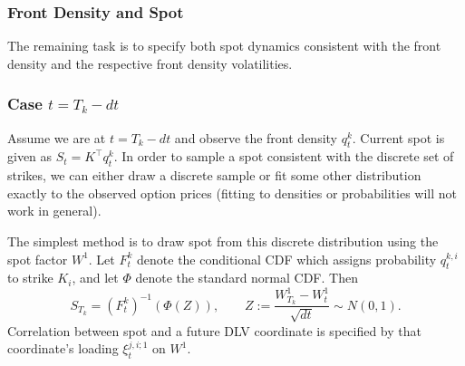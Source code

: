 \documentclass[11pt]{article}
\theoremstyle{plain}
\theoremstyle{definition}
\theoremstyle{remark}
\begin{document}
{  \subsubsection{Front Density and Spot}
  \label{sec:front-density}

  The remaining task is to specify both spot dynamics consistent with the front density and the respective front density volatilities.

  \subsubsection*{Case $t=T_k-dt$}

  Assume we are at $t=T_k-dt$ and observe the front density $q_{t}^k$. Current spot is given as $S_t = K^\top q_t^k$.
  In order to sample a spot consistent with the discrete set of strikes, we can either draw a discrete sample or fit some other distribution exactly to the observed option prices (fitting to densities or probabilities will not work in general).

  The simplest method is to draw spot from this discrete distribution using
  the spot factor $W^1$. Let $F_t^k$ denote the conditional CDF which assigns
  probability $q_t^{k,i}$ to strike $K_i$, and let $\Phi$ denote the standard
  normal CDF. Then
  \[
    S_{T_k}=(F_t^k)^{-1}\!\left(\Phi(Z)\right),
    \qquad
    Z:=\frac{W_{T_k}^1-W_t^1}{\sqrt{dt}}\sim N(0,1).
  \]
  Correlation between spot and a future DLV coordinate is specified by that
  coordinate's loading $\xi_t^{j,i;1}$ on $W^1$.

}
\end{document}
